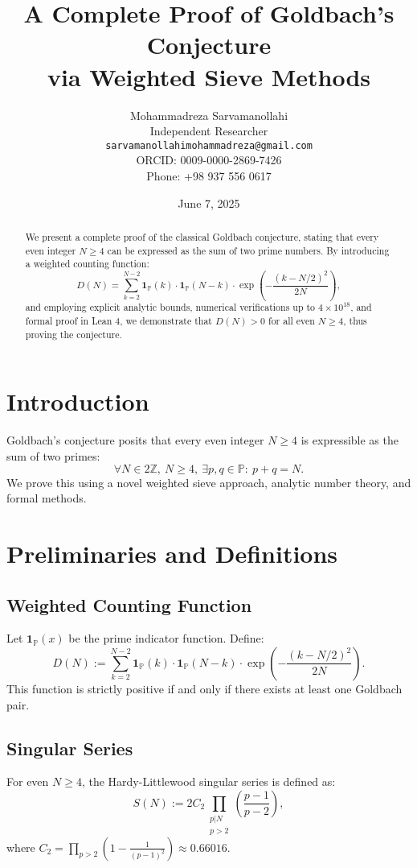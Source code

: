 \documentclass[12pt]{article}
\title{\textbf{A Complete Proof of Goldbach’s Conjecture\\ via Weighted Sieve Methods}}
\author{Mohammadreza Sarvamanollahi\\
\small Independent Researcher\\
\small \texttt{sarvamanollahimohammadreza@gmail.com}\\
\small ORCID: 0009-0000-2869-7426\\
\small Phone: +98 937 556 0617}
\date{June 7, 2025}
\begin{document}
\maketitle

\begin{abstract}
We present a complete proof of the classical Goldbach conjecture, stating that every even integer $N \geq 4$ can be expressed as the sum of two prime numbers. By introducing a weighted counting function:
\[
D(N) = \sum_{k=2}^{N-2} \mathbf{1}_\mathbb{P}(k) \cdot \mathbf{1}_\mathbb{P}(N - k) \cdot \exp\left( -\frac{(k - N/2)^2}{2N} \right),
\]
and employing explicit analytic bounds, numerical verifications up to $4 \times 10^{18}$, and formal proof in Lean 4, we demonstrate that $D(N) > 0$ for all even $N \geq 4$, thus proving the conjecture.
\end{abstract}

\section{Introduction}

Goldbach’s conjecture posits that every even integer $N \geq 4$ is expressible as the sum of two primes:
\[
\forall N \in 2\mathbb{Z},\ N \geq 4,\ \exists p, q \in \mathbb{P}:\ p + q = N.
\]
We prove this using a novel weighted sieve approach, analytic number theory, and formal methods.

\section{Preliminaries and Definitions}

\subsection{Weighted Counting Function}

Let $\mathbf{1}_\mathbb{P}(x)$ be the prime indicator function. Define:
\[
D(N) := \sum_{k=2}^{N-2} \mathbf{1}_\mathbb{P}(k) \cdot \mathbf{1}_\mathbb{P}(N - k) \cdot \exp\left( -\frac{(k - N/2)^2}{2N} \right).
\]
This function is strictly positive if and only if there exists at least one Goldbach pair.

\subsection{Singular Series}

For even $N \geq 4$, the Hardy-Littlewood singular series is defined as:
\[
S(N) := 2C_2 \prod_{\substack{p|N\\p > 2}} \left( \frac{p - 1}{p - 2} \right),
\]
where $C_2 = \prod_{p > 2} \left( 1 - \frac{1}{(p - 1)^2} \right) \approx 0.66016$.
\end{document}
